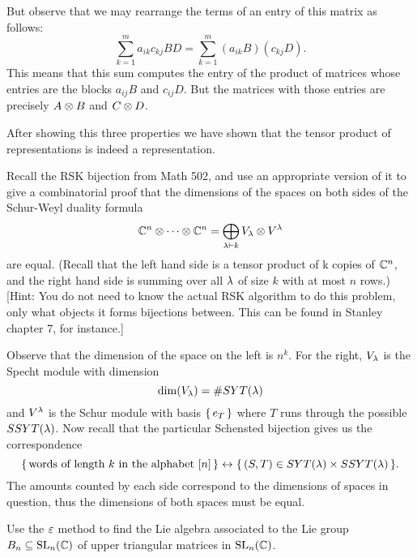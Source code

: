 \documentclass[12pt]{memoir}
\begin{document}
\begin{ptcbr}
    But observe that we may rearrange the terms of an entry of this matrix as follows: 
    $$\sum_{k=1}^{m}a_{ik}c_{kj}BD=\sum_{k=1}^{m}(a_{ik}B)(c_{kj}D).$$
    This means that this sum computes the entry of the product of matrices whose entries are the blocks $a_{ij}B$ and $c_{ij}D$. But the matrices with those entries are precisely $A\otimes B$ and $C\otimes D$.\par
    After showing this three properties we have shown that the tensor product of representations is indeed a representation. 
\end{ptcbr}
\begin{Ej}
    Recall the RSK bijection from Math 502, and use an appropriate version of it to give a combinatorial proof that the dimensions of the spaces on both sides of the Schur-Weyl duality formula
    $$\mathbb{C}^n\otimes\cdots\otimes\mathbb{C}^n=\bigoplus_{\lambda\vdash k} V_\lambda\otimes V^\lambda$$
    are equal. (Recall that the left hand side is a tensor product of k copies of $\mathbb{C}^n$, and the right hand side
    is summing over all $\lambda$ of size $k$ with at most $n$ rows.)
    [Hint: You do not need to know the actual RSK algorithm to do this problem, only what objects it
    forms bijections between. This can be found in Stanley chapter 7, for instance.]
\end{Ej}

\begin{ptcbr}
    Observe that the dimension of the space on the left is $n^k$. For the right, $V_\lambda$ is the Specht module with dimension 
    $$\dim(V_\lambda)=\#SYT(\lambda)$$
    and $V^\lambda$ is the Schur module with basis $\{\,e_T\,\}$ where $T$ runs through the possible $SSYT(\lambda)$. Now recall that the particular Schensted bijection gives us the correspondence 
    $$\{\,\text{words of length }k\text{ in the alphabet }[n]\,\}\leftrightarrow\{\,(S,T)\in SYT(\lambda)\times SSYT(\lambda)\,\}.$$
    The amounts counted by each side correspond to the dimensions of spaces in question, thus the dimensions of both spaces must be equal.
\end{ptcbr}
\begin{Ej}
    Use the $\varepsilon$ method to ﬁnd the Lie algebra associated to the Lie group $B_n\subseteq\mathrm{SL}_n(\mathbb{C})$ of upper
triangular matrices in $\mathrm{SL}_n(\mathbb{C})$.
\end{Ej}
\end{document}
